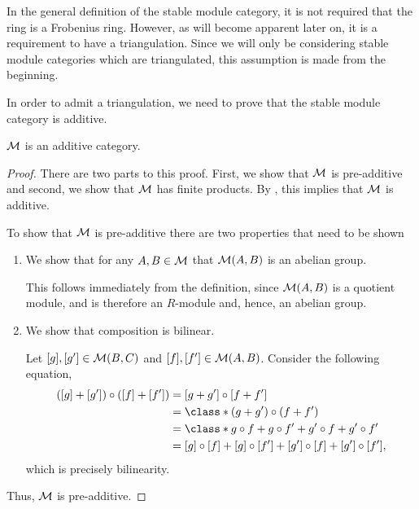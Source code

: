 In the general definition of the stable module category, it is not required that the ring is a Frobenius ring. However, as will become apparent later on, it is a requirement to have a triangulation. Since we will only be considering stable module categories which are triangulated, this assumption is made from the beginning.

In order to admit a triangulation, we need to prove that the stable module category is additive.

\begin{lemma}
    \( {\mathcal{M}} \) is an additive category.
\end{lemma}
\begin{proof}
    There are two parts to this proof. First, we show that \( {\mathcal{M}} \) is pre-additive and second, we show that \( {\mathcal{M}} \) has finite products. By \cite[p.\ 251]{Mac_Lane_1995}, this implies that \( {\mathcal{M}} \) is additive.

    To show that \( {\mathcal{M}} \) is pre-additive there are two properties that need to be shown
    \begin{enumerate}
        \item {
            We show that for any \( A, B \in {\mathcal{M}} \) that \( {\mathcal{M}}(A, B) \) is an abelian group.

            This follows immediately from the definition, since \( {\mathcal{M}}(A, B) \) is a quotient module, and is therefore an \( R \)-module and, hence, an abelian group.
        }
        \item {
            We show that composition is bilinear.

            Let \( [g], [g'] \in {\mathcal{M}}(B, C) \) and \( [f], [f'] \in {\mathcal{M}}(A, B) \). Consider the following equation,
            \begin{align*}
                ([g] + [g']) \circ ([f] + [f']) &= [g + g'] \circ [f + f'] \\
                &= \class*{(g + g') \circ (f + f')} \\
                &= \class*{g \circ f + g \circ f' + g' \circ f + g' \circ f'} \\
                &= [g] \circ [f] + [g] \circ [f'] + [g'] \circ [f] + [g'] \circ [f'],
            \end{align*}
            which is precisely bilinearity.
        }
    \end{enumerate}
    Thus, \( {\mathcal{M}} \) is pre-additive.


\end{proof}
